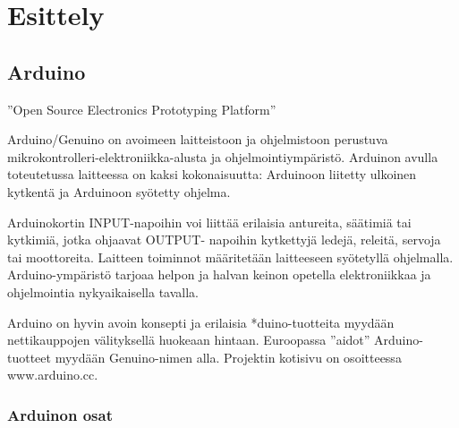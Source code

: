 
\chapter{Esittely}

\section{Arduino}

”Open Source Electronics Prototyping Platform”

Arduino/Genuino on avoimeen laitteistoon ja ohjelmistoon perustuva mikrokontrolleri-elektroniikka-alusta ja ohjelmointiympäristö. Arduinon avulla toteutetussa laitteessa on kaksi kokonaisuutta: Arduinoon liitetty ulkoinen kytkentä ja Arduinoon syötetty ohjelma.

Arduinokortin INPUT-napoihin voi liittää erilaisia antureita, säätimiä tai kytkimiä, jotka ohjaavat OUTPUT- napoihin kytkettyjä ledejä, releitä, servoja tai moottoreita. Laitteen toiminnot määritetään laitteeseen syötetyllä ohjelmalla. Arduino-ympäristö tarjoaa helpon ja halvan keinon opetella elektroniikkaa ja ohjelmointia nykyaikaisella tavalla.

Arduino on hyvin avoin konsepti ja erilaisia *duino-tuotteita myydään nettikauppojen välityksellä huokeaan hintaan. Euroopassa ”aidot” Arduino-tuotteet myydään Genuino-nimen alla. Projektin kotisivu on osoitteessa www.arduino.cc.


\newpage
\subsection*{Arduinon osat}

